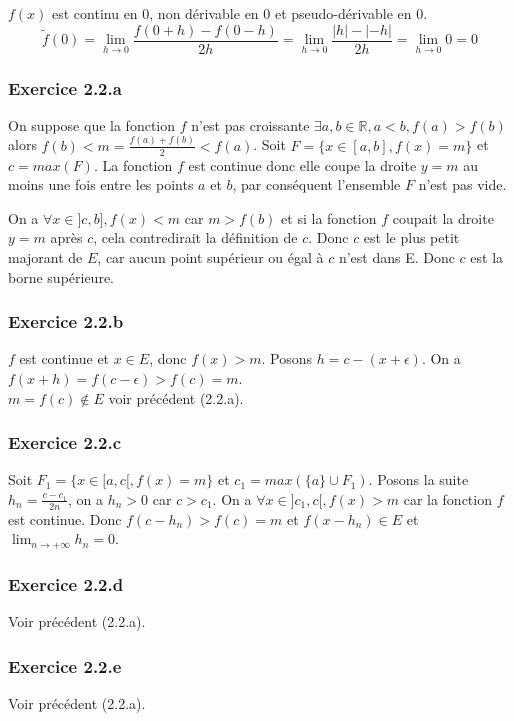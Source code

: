 \documentclass[]{book}
\theoremstyle{definition}
\newcommand{\bb}[1]{\mathbb{#1}}
\newcommand{\R}{\bb{R}}
\begin{document}
$f(x)$ est continu en 0, non d\'erivable en 0 et pseudo-d\'erivable en 0.
$$\tilde{f}(0)= \lim_{h \to 0} \frac{f(0+h)-f(0-h)}{2h} = \lim_{h \to 0} \frac{|h|-|-h|}{2h} = \lim_{h \to 0} 0 = 0$$


\subsubsection*{Exercice 2.2.a}

On suppose que la fonction $f$ n'est pas croissante $\exists a,b \in \R, a<b, f(a) > f(b)$ alors $f(b) < m = \frac{f(a)+f(b)}{2} < f(a)$. Soit $F=\{x \in [a,b], f(x) = m\}$ et $c = max(F)$. La fonction $f$ est continue donc elle coupe la droite $y=m$ au moins une fois entre les points $a$ et $b$, par cons\'equent l'ensemble $F$ n'est pas vide.   

On a $\forall x \in ]c,b], f(x) < m$ car $m > f(b)$ et si la fonction $f$ coupait la droite $y=m$ apr\`es $c$, cela contredirait la d\'efinition de $c$. Donc $c$ est le plus petit majorant de $E$, car aucun point sup\'erieur ou \'egal \`a $c$ n'est dans E. Donc $c$ est la borne sup\'erieure.

\subsubsection*{Exercice 2.2.b}
$f$ est continue et $x \in E$, donc $f(x) > m$. Posons $h = c-(x+\epsilon)$. On a $f(x+h) = f(c-\epsilon) > f(c) = m$. \\

$m = f(c) \notin E$ voir pr\'ec\'edent (2.2.a).

\subsubsection*{Exercice 2.2.c}
Soit $F_1=\{x \in [a,c[, f(x) = m\}$ et $c_1 = max(\{a\} \cup F_1)$.
Posons la suite $h_n = \frac{c-c_1}{2n}$, on a $h_n > 0$ car $c>c_1$. On a $\forall x \in ]c_1,c[, f(x) > m$ car la fonction $f$ est continue. Donc $f(c-h_n) > f(c) = m$ et $f(x-h_n) \in E$ et $\lim_{n \to +\infty} h_n = 0$.

\subsubsection*{Exercice 2.2.d}
Voir pr\'ec\'edent (2.2.a).

\subsubsection*{Exercice 2.2.e}
Voir pr\'ec\'edent (2.2.a).
\end{document}
